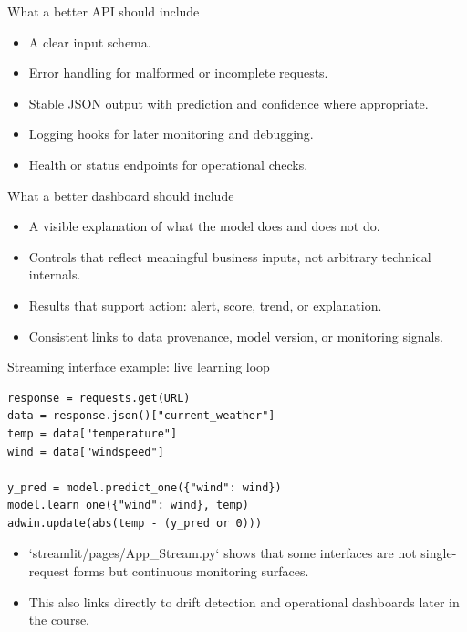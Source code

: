 \begin{frame}{What a better API should include}
\begin{itemize}
\item A clear input schema.
\item Error handling for malformed or incomplete requests.
\item Stable JSON output with prediction and confidence where appropriate.
\item Logging hooks for later monitoring and debugging.
\item Health or status endpoints for operational checks.
\end{itemize}
\coursefooter
\end{frame}

\begin{frame}{What a better dashboard should include}
\begin{itemize}
\item A visible explanation of what the model does and does not do.
\item Controls that reflect meaningful business inputs, not arbitrary technical internals.
\item Results that support action: alert, score, trend, or explanation.
\item Consistent links to data provenance, model version, or monitoring signals.
\end{itemize}
\coursefooter
\end{frame}

\begin{frame}[fragile]{Streaming interface example: live learning loop}
\begin{lstlisting}[style=coursepython]
response = requests.get(URL)
data = response.json()["current_weather"]
temp = data["temperature"]
wind = data["windspeed"]

y_pred = model.predict_one({"wind": wind})
model.learn_one({"wind": wind}, temp)
adwin.update(abs(temp - (y_pred or 0)))
\end{lstlisting}
\begin{itemize}
\item `streamlit/pages/App_Stream.py` shows that some interfaces are not single-request forms but continuous monitoring surfaces.
\item This also links directly to drift detection and operational dashboards later in the course.
\end{itemize}
\coursefooter
\end{frame}

